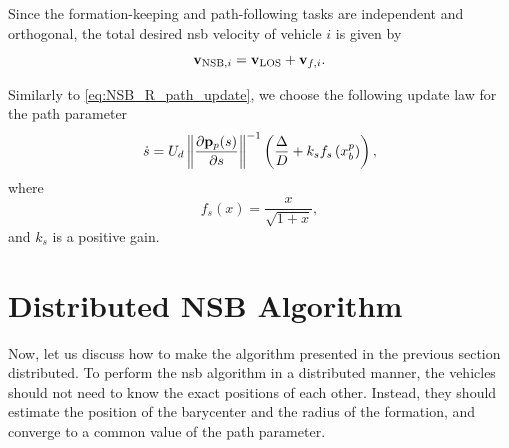 Since the formation-keeping and path-following tasks are independent and orthogonal, the total desired \gls{nsb} velocity of vehicle $i$ is given by
\begin{equation}
    \mathbf{v}_{{\rm NSB}, i} = \mathbf{v}_{\rm LOS} + \mathbf{v}_{f, i}.
\end{equation}

Similarly to \eqref{eq:NSB_R_path_update}, we choose the following update law for the path parameter
\begin{equation}
    \dot{s} = U_d \left\|\frac{\partial \mathbf{p}_p(s)}{\partial s}\right\|^{-1} \left(\frac{\Delta}{D} + k_s f_s\left(x_b^p\right)\right),
    \label{eq:distr_NSB_path_parameter}
\end{equation}
where
\begin{equation}
    f_s(x) = \frac{x}{\sqrt{1 + x}},
\end{equation}
and $k_s$ is a positive gain.

\section{Distributed NSB Algorithm}
\label{sec:distr_NSB_distributed_NSB}
Now, let us discuss how to make the algorithm presented in the previous section distributed.
To perform the \gls{nsb} algorithm in a distributed manner, the vehicles should not need to know the exact positions of each other.
Instead, they should estimate the position of the barycenter and the radius of the formation, and converge to a common value of the path parameter.

